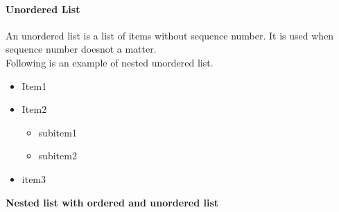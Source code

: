 \documentclass{article}
\begin{document}
	\paragraph{Unordered List}An unordered list is a list of items without sequence number.
	It is used when sequence number doesnot a matter.\\
	\noindent Following is an example of nested unordered list.
	\begin{itemize}
		\item Item1
		\item Item2
			\begin{itemize}
				\item subitem1
				\item subitem2
			\end{itemize}
		\item item3
	\end{itemize}
	\centering
	\begin{large}\textbf{Nested list with ordered and unordered list}\end{large}
\end{document}
